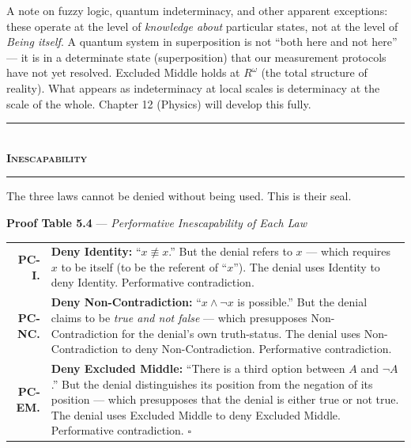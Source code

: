 \documentclass[10pt, openany, oneside]{book}
\renewcommand{\normalsize}{\fontsize{10}{13}\selectfont}
\renewcommand{\footnotesize}{\fontsize{8.5}{11}\selectfont}
\begin{document}
A note on fuzzy logic, quantum indeterminacy, and other apparent exceptions: these operate at the level of \textit{knowledge about} particular states, not at the level of \textit{Being itself}. A quantum system in superposition is not ``both here and not here'' --- it is in a determinate state (superposition) that our measurement protocols have not yet resolved. Excluded Middle holds at $R^\omega$ (the total structure of reality). What appears as indeterminacy at local scales is determinacy at the scale of the whole. Chapter 12 (Physics) will develop this fully.

\vspace{1.5em}


\begin{center}
    \rule{0.3\textwidth}{0.4pt}\\[0.5em]
    {\normalsize\bfseries\scshape Inescapability}\\[0.3em]
    \rule{0.3\textwidth}{0.4pt}
\end{center}

\vspace{1em}

\noindent The three laws cannot be denied without being used. This is their seal.

\vspace{0.5em}

\textbf{Proof Table 5.4} --- \textit{Performative Inescapability of Each Law}

\vspace{0.5em}

{\footnotesize
\noindent\begin{tabular}{r p{}}
\textbf{PC-I.} & \textbf{Deny Identity:} ``$x \not\equiv x$.'' But the denial refers to $x$ --- which requires $x$ to be itself (to be the referent of ``$x$''). The denial uses Identity to deny Identity. Performative contradiction. \\[0.3em]
\textbf{PC-NC.} & \textbf{Deny Non-Contradiction:} ``$x \wedge \neg x$ is possible.'' But the denial claims to be \textit{true and not false} --- which presupposes Non-Contradiction for the denial's own truth-status. The denial uses Non-Contradiction to deny Non-Contradiction. Performative contradiction. \\[0.3em]
\textbf{PC-EM.} & \textbf{Deny Excluded Middle:} ``There is a third option between $A$ and $\neg A$.'' But the denial distinguishes its position from the negation of its position --- which presupposes that the denial is either true or not true. The denial uses Excluded Middle to deny Excluded Middle. Performative contradiction. $\square$ \\[0.3em]
\end{tabular}
}
\end{document}
